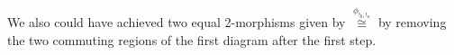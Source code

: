 \documentclass[reqno]{amsart}
\begin{document}
We also could have achieved two equal 2-morphisms given by $\stackrel{\phi_{!_0,!_a}} \cong$ by removing the two commuting regions of the first diagram after the first step.
\end{document}
